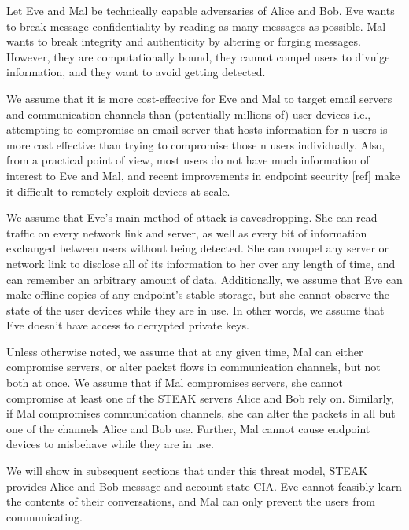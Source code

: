 Let Eve and Mal be technically capable adversaries of Alice and Bob.  Eve wants to break message confidentiality by reading as many messages as possible.  Mal wants to break integrity and authenticity by altering or forging messages.  However, they are computationally bound, they cannot compel users to divulge information, and they want to avoid getting detected.

We assume that it is more cost-effective for Eve and Mal to target email servers and communication channels than (potentially millions of) user devices i.e., attempting to compromise an email server that hosts information for n users is more cost effective than trying to compromise those n users individually. Also, from a practical point of view, most users do not have much information of interest to Eve and Mal, and recent improvements in endpoint security [ref] make it difficult to remotely exploit devices at scale.

We assume that Eve’s main method of attack is eavesdropping. She can read traffic on every network link and server, as well as every bit of information exchanged between users without being detected.  She can compel any server or network link to disclose all of its information to her over any length of time, and can remember an arbitrary amount of data. Additionally, we assume that Eve can make offline copies of any endpoint’s stable storage, but she cannot observe the state of the user devices while they are in use. In other words, we assume that Eve doesn’t have access to decrypted private keys.  

Unless otherwise noted, we assume that at any given time, Mal can either compromise servers, or alter packet flows in communication channels, but not both at once. We assume that if Mal compromises servers, she cannot compromise at least one of the STEAK servers Alice and Bob rely on. Similarly, if Mal compromises communication channels, she can alter the packets in all but one of the channels Alice and Bob use. Further, Mal cannot cause endpoint devices to misbehave while they are in use.

We will show in subsequent sections that under this threat model, STEAK provides Alice and Bob message and account state CIA.  Eve cannot feasibly learn the contents of their conversations, and Mal can only prevent the users from communicating.

